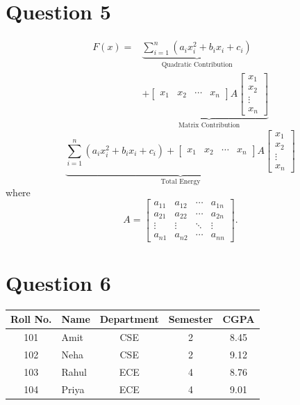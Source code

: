 \documentclass[12pt,a4paper]{article}
\begin{document}
\section*{Question 5}
\[
\begin{aligned}
F(x)={}&
\underbrace{\sum_{i=1}^{n}
\left(a_i x_i^2+b_i x_i+c_i\right)}_{\text{Quadratic Contribution}}
\\
&+
\underbrace{
\begin{bmatrix}x_1&x_2&\cdots&x_n\end{bmatrix}
A
\begin{bmatrix}
x_1\\x_2\\\vdots\\x_n
\end{bmatrix}
}_{\text{Matrix Contribution}}
\end{aligned}
\]
\[
\underbrace{
\sum_{i=1}^{n}(a_i x_i^2+b_i x_i+c_i)
+
\begin{bmatrix}x_1&x_2&\cdots&x_n\end{bmatrix}
A
\begin{bmatrix}x_1\\x_2\\\vdots\\x_n\end{bmatrix}
}_{\text{Total Energy}}
\]
where
\[
A=
\begin{bmatrix}
a_{11} & a_{12} & \cdots & a_{1n}\\
a_{21} & a_{22} & \cdots & a_{2n}\\
\vdots & \vdots & \ddots & \vdots\\
a_{n1} & a_{n2} & \cdots & a_{nn}
\end{bmatrix}.
\]

\section*{Question 6}
\begin{center}
\begin{tabular}{|c|l|c|c|c|}
\hline
\textbf{Roll No.} & \textbf{Name} & \textbf{Department} & \textbf{Semester} & \textbf{CGPA}\\
\hline
101 & Amit & CSE & 2 & 8.45\\
102 & Neha & CSE & 2 & 9.12\\
103 & Rahul & ECE & 4 & 8.76\\
104 & Priya & ECE & 4 & 9.01\\
\hline
\end{tabular}
\end{center}
\end{document}
